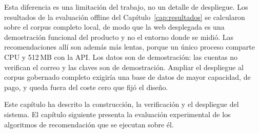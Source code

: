 Esta diferencia es una limitación del trabajo, no un detalle de despliegue. Los resultados de la evaluación offline del
Capítulo~\ref{cap:resultados} se calcularon sobre el corpus completo local, de modo que la web desplegada es una
demostración funcional del producto y no el entorno donde se midió. Las recomendaciones allí son además más lentas, porque
un único proceso comparte CPU y 512\,MB con la API. Los datos son de demostración: las cuentas no verifican el correo y
las claves son de demostración. Ampliar el despliegue al corpus gobernado completo exigiría una base de datos de mayor
capacidad, de pago, y queda fuera del coste cero que fijó el diseño.

Este capítulo ha descrito la construcción, la verificación y el despliegue del sistema. El
capítulo siguiente presenta la evaluación experimental de los algoritmos de recomendación que
se ejecutan sobre él.
